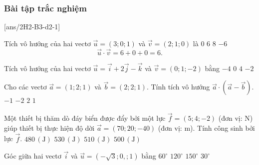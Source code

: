 \subsubsection{Bài tập trắc nghiệm}
\TN
{}[ans/2H2-B3-d2-1]

\begin{ex}
	Tích vô hướng của hai vectơ $\vec{u}=(3;0;1)$ và $\vec{v}=(2;1;0)$ là
	\choice
	{$0$}
	{\True$6$}
	{$8$}
	{$-6$}
	\loigiai
	{
		$$\vec{u}\cdot\vec{v}=6+0+0=6.$$
	}
\end{ex} 

\begin{ex}
	Tích vô hướng của hai vectơ $\vec{u} = \vec{i} + 2 \vec{j} - \vec{k}$ và $ \vec{v} = (0;1; -2)$ bằng
	\choice
	{$ -4 $}
	{$ 0 $}
	{\True $ 4 $}
	{$ -2 $}
\end{ex} 


\begin{ex}
	Cho các vectơ $\vec{a}=(1;2;1)$ và $\vec{b}=(2;2;1)$. Tính tích vô hướng $\vec{a} \cdot \left(\vec{a}-\vec{b}\right)$.
	\choice
	{\True $-1$}
	{$-2$}
	{$2$}
	{$1$}
\end{ex} 

\begin{ex}
	Một thiết bị thăm dò đáy biển được đẩy bởi một lực $\overrightarrow{f} = (5; 4; -2)$ (đơn vị: N) giúp thiết bị thực hiện độ dời $\overrightarrow{a} = (70; 20; -40)$ (đơn vị: m). Tính công sinh bởi lực $\overrightarrow{f}$.
	\choice
	{$480\,(\text{J})$}
	{$530\,(\text{J})$}
	{\True $510\,(\text{J})$}
	{$500\,(\text{J})$}
\end{ex} 

\begin{ex}
	Góc giữa hai vectơ $ \vec{i} $ và $ \vec{u}=(-\sqrt{3};0,;1) $ bằng
	\choice
	{$ 60^\circ $}
	{$ 120^\circ $}
	{\True $ 150^\circ $}
	{$ 30^\circ $}
\end{ex} 

